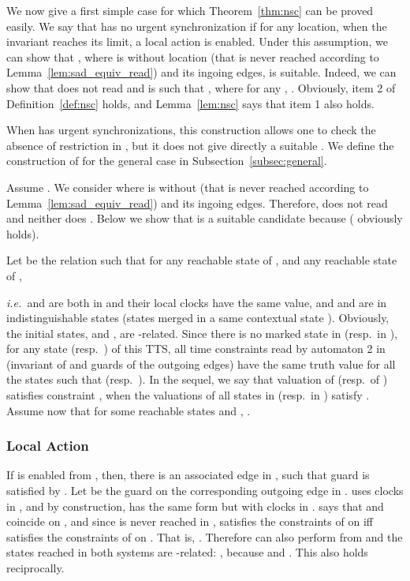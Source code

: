 \documentclass{LMCS}
\theoremstyle{plain}\newtheorem*{prop11}{Proposition~\ref{prop:states} bis}
\def\ie{{\em i.e.\ }}
\begin{document}
We now give a first simple case for which Theorem~\ref{thm:nsc} can be proved
easily. We say that  has no urgent synchronization if for any location,
when the invariant reaches its limit, a local action is enabled.
Under this assumption, we can show that
, where  is
 without location  (that is never reached according to
Lemma~\ref{lem:sad_equiv_read}) and its ingoing edges, is suitable.
Indeed, we can show that  does not read  and is such that
, where for any
, .
Obviously, item 2 of Definition~\ref{def:nsc} holds, and Lemma~\ref{lem:nsc}
says that item 1 also holds.

When  has urgent synchronizations, this construction allows one to check
the absence of restriction in , but it does not give directly
a suitable . We define the construction of  for
the general case in Subsection~\ref{subsec:general}.



\label{proof}\hfill


  \noindent Assume .
  We consider
   where  is
   without  (that is never reached according to
  Lemma~\ref{lem:sad_equiv_read}) and its ingoing edges. Therefore,
   does not read  and neither does
  . Below we show that  is a suitable
  candidate because 
  ( obviously holds).

  Let  be the relation such that for any reachable state  of
  , and any reachable state  of ,
  
  \ie  and  are both in  and their local
  clocks have the same value, and  and  are in
  indistinguishable states (states merged in a same contextual state ).
Obviously, the initial states,  and
  , are -related.
Since there is no marked state in  (resp.\ in
  ), for any state  (resp.\
  ) of this TTS, all time constraints read by automaton 2 in
   (invariant of  and guards of the outgoing edges) have the
  same truth value for all the states  such that 
  (resp.\ ).
In the sequel, we say that valuation  of  (resp.\  of ) satisfies
  constraint , when the valuations of all states  in 
  (resp.\ in ) satisfy .
  Assume now that for some reachable states  and ,
  .

  \subsubsection*{Local Action}
  If  is enabled from , then,
  there is an associated edge in ,  such that
  guard  is satisfied by .
  Let  be the guard on the corresponding outgoing edge
   in .
   uses clocks in , and by construction,
   has the same form but with clocks in .
   says that  and  coincide on , and since
   is never reached in ,  satisfies the constraints of 
  on  iff  satisfies the constraints of  on .
  That is, . Therefore  can also perform
   from  and the states reached in both systems
  are -related: , because  and
  .
  This also holds reciprocally.
\end{document}
